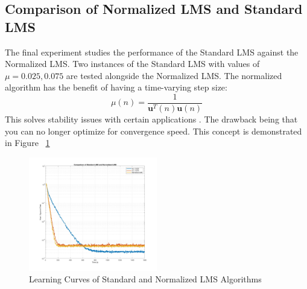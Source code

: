 \documentclass[journal]{IEEEtran}
\begin{document}
\subsection{Comparison of Normalized LMS and Standard LMS}
The final experiment studies the performance of the Standard LMS against the Normalized LMS. Two instances of the
Standard LMS with values of $\mu = 0.025, 0.075$ are tested alongside the Normalized LMS. The normalized algorithm has the
benefit of having a time-varying step size:
$$\mu(n) = \dfrac{1}{\boldsymbol{u}^T(n)\boldsymbol{u}(n)}$$
This solves stability issues with certain applications \cite{haykin2008adaptive}. The drawback being that you can no longer
optimize for convergence speed. This concept is demonstrated in Figure ~\ref{fig:normalizedlms}
\begin{figure}[H]
  \centering
  \captionsetup{justification=centering,font = small}
  \includegraphics[width=0.50\textwidth, right] {Plots/Project1_Part5.jpg}
  \caption{Learning Curves of Standard and Normalized LMS Algorithms}
    \label{fig:normalizedlms}
\end{figure}

\end{document}
